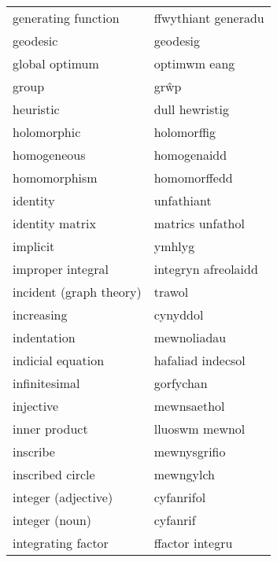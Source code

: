 \begin{supertabular}{p{0.22\textwidth}p{0.22\textwidth}}
             generating function &             ffwythiant generadu \\
                        geodesic &                        geodesig \\
                  global optimum &                    optimwm eang \\
                           group &                            grŵp \\
                       heuristic &                  dull hewristig \\
                     holomorphic &                     holomorffig \\
                     homogeneous &                     homogenaidd \\
                    homomorphism &                    homomorffedd \\
                        identity &                      unfathiant \\
                 identity matrix &                matrics unfathol \\
                        implicit &                          ymhlyg \\
               improper integral &             integryn afreolaidd \\
         incident (graph theory) &                          trawol \\
                      increasing &                        cynyddol \\
                     indentation &                     mewnoliadau \\
               indicial equation &               hafaliad indecsol \\
                   infinitesimal &                       gorfychan \\
                       injective &                     mewnsaethol \\
                   inner product &                  lluoswm mewnol \\
                        inscribe &                    mewnysgrifio \\
                inscribed circle &                       mewngylch \\
             integer (adjective) &                      cyfanrifol \\
                  integer (noun) &                        cyfanrif \\
              integrating factor &                 ffactor integru \\

\end{supertabular}

